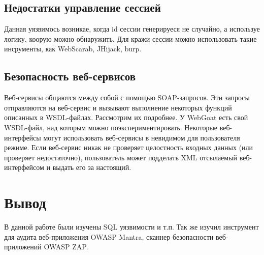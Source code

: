\documentclass[11pt, a4paper]{article}		%
\begin{document}

\subsection{Недостатки управление сессией}

Данная уязвимось возникае, когда id сессии генерируеся не случайно, а используе логику, коорую можно обнаружить. Для кражи сессии можно использовать такие инсрументы, как WebScarab, JHijack, burp.



\subsection{Безопасность веб-сервисов}

Веб-сервисы общаются между собой с помощью SOAP-запросов. Эти запросы отправляются на веб-сервис и вызывают выполнение некоторых функций описанных в WSDL-файлах. Рассмотрим их подробнее. У WebGoat есть свой WSDL-файл, над которым можно поэкспериментировать. Некоторые веб-интерфейсы могут использовать веб-сервисы в невидимом для пользователя режиме. Если веб-сервис никак не проверяет целостность входных данных (или проверяет недостаточно), пользователь может подделать XML отсылаемый веб-интерфейсом и выдать его за настоящий.



\section{Вывод}
В данной работе были изучены SQL уязвимости и т.п. Так же изучил инструмент для аудита веб-приложения OWASP Mantra, сканнер безопасности веб-приложений OWASP ZAP. 
\end{document}
